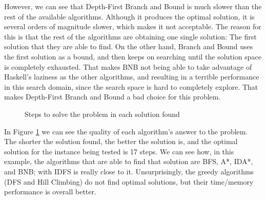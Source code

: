 However, we can see that Depth-First Branch and Bound is much slower than the
rest of the available algorithms. Although it produces the optimal solution, it
is several orders of magnitude slower, which makes it not acceptable. The
reason for this is that the rest of the algorithms are obtaining one single
solution: The first solution that they are able to find. On the other hand,
Branch and Bound uses the first solution as a bound, and then keeps on searching
until the solution space is completely exhausted. That makes BNB not being able
to take advantage of Haskell's laziness as the other algorithms, and resulting
in a terrible performance in this search domain, since the search space is hard
to completely explore. That makes Depth-First Branch and Bound a bad choice for
this problem.\\

\begin{figure}[!htbp]
  \centering
  \caption{Steps to solve the problem in each solution found}
  \label{8p:steps}
\end{figure}

In Figure \ref{8p:steps} we can see the quality of each algorithm's answer to
the problem. The shorter the solution found, the better the solution is, and
the optimal solution for the instance being tested is 17 steps. We can see how,
in this example, the algorithms that are able to find that solution are BFS,
A*, IDA*, and BNB; with IDFS is really close to it. Unsurprisingly, the greedy
algorithms (DFS and Hill Climbing) do not find optimal solutions, but their
time/memory performance is overall better.\\

